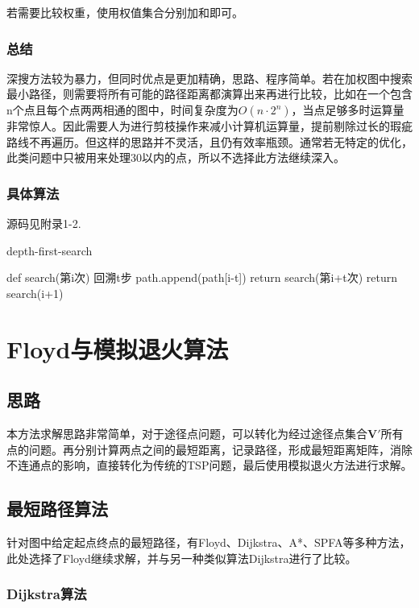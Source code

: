 \documentclass[12pt]{article}
\begin{document}
若需要比较权重，使用权值集合分别加和即可。

\subsubsection{总结}
深搜方法较为暴力，但同时优点是更加精确，思路、程序简单。若在加权图中搜索最小路径，则需要将所有可能的路径距离都演算出来再进行比较，比如在一个包含n个点且每个点两两相通的图中，时间复杂度为$O(n\cdot 2^{n}) $，当点足够多时运算量非常惊人。因此需要人为进行剪枝操作来减小计算机运算量，提前剔除过长的瑕疵路线不再遍历。但这样的思路并不灵活，且仍有效率瓶颈。通常若无特定的优化，此类问题中只被用来处理30以内的点，所以不选择此方法继续深入。
\subsubsection{具体算法}
源码见附录1-2.
\begin{algorithm}[]
\caption{depth-first-search}
\LinesNumbered
{}
def {search}(第i次)\;
        {回溯t步\;
        path.append(path[i-t])\;
            {return {search}(第i+t次)\;
            }
        }
    {return {search}(i+1)\;}
\end{algorithm}
\newpage
\section{Floyd与模拟退火算法}
\subsection{思路}
本方法求解思路非常简单，对于途径点问题，可以转化为经过途径点集合$\mathbf{V'}$所有点的问题。再分别计算两点之间的最短距离，记录路径，形成最短距离矩阵，消除不连通点的影响，直接转化为传统的TSP问题，最后使用模拟退火方法进行求解。
\subsection{ 最短路径算法}
针对图中给定起点终点的最短路径，有Floyd、Dijkstra、A*、SPFA等多种方法，此处选择了Floyd继续求解，并与另一种类似算法Dijkstra进行了比较。
\setcounter{footnote}{0}
\subsubsection{Dijkstra算法}
\end{document}
